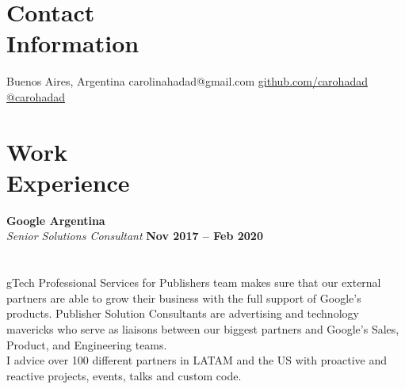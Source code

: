 \documentclass[margin,line]{resume}
\begin{document}
\begin{resume}

\section{\mysidestyle Contact\\Information}

\faMapMarker \vspace{5mm} Buenos Aires, Argentina \hfill
\faEnvelope \vspace{5mm} carolinahadad@gmail.com
\faGithub \vspace{5mm} \href{https://github.com/carohadad}{github.com/carohadad} \hfill
\faTwitter \vspace{5mm} \href{https://twitter.com/carohadad}{@carohadad}

\vspace{-1.5cm}
\section{\mysidestyle Work\\Experience}


\textbf{Google Argentina}\vspace{2mm}\\\vspace{1mm}
\textsl{Senior Solutions Consultant} 
 \hfill \textbf{Nov 2017 -- Feb 2020}\vspace{-3mm}\\\vspace{-1mm}
\hfill \vspace{-3mm}\\\vspace{-1mm}
\\
gTech Professional Services for Publishers team makes sure that our external partners are able to grow their business with the full support of Google's products. Publisher Solution Consultants are advertising and technology mavericks who serve as liaisons between our biggest partners and Google's Sales, Product, and Engineering teams. 
\\
I advice over 100 different partners in LATAM and the US with proactive and reactive projects, events, talks and custom code.


\end{resume}
\end{document}
